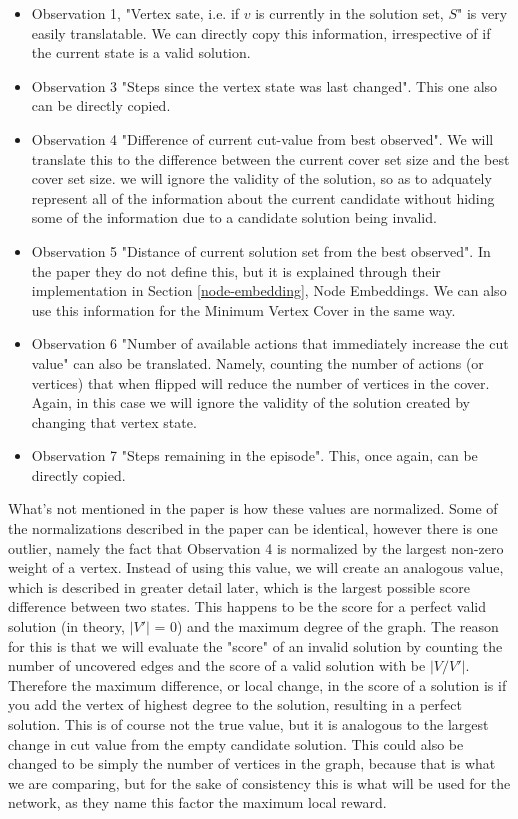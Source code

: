\documentclass{article}
\begin{document}
\begin{itemize}
    \item Observation 1, "Vertex sate, i.e. if $v$ is currently in the solution set, $S$" is very easily translatable. We can directly copy this information, irrespective of if the current state is a valid solution.
    \item Observation 3 "Steps since the vertex state was last changed". This one also can be directly copied.
    \item Observation 4 "Difference of current cut-value from best observed". We will translate this to the difference between the current cover set size and the best cover set size. we will ignore the validity of the solution, so as to adquately represent all of the information about the current candidate without hiding some of the information due to a candidate solution being invalid.
    \item Observation 5 "Distance of current solution set from the best observed". In the paper they do not define this, but it is explained through their implementation in Section \ref{node-embedding}, Node Embeddings. We can also use this information for the Minimum Vertex Cover in the same way.
    \item Observation 6 "Number of available actions that immediately increase the cut value" can also be translated. Namely, counting the number of actions (or vertices) that when flipped will reduce the number of vertices in the cover. Again, in this case we will ignore the validity of the solution created by changing that vertex state.
    \item Observation 7 "Steps remaining in the episode". This, once again, can be directly copied.
\end{itemize}

What's not mentioned in the paper is how these values are normalized. Some of the normalizations described in the paper can be identical, however there is one outlier, namely the fact that Observation 4 is normalized by the largest non-zero weight of a vertex. Instead of using this value, we will create an analogous value, which is described in greater detail later, which is the largest possible score difference between two states. This happens to be the score for a perfect valid solution (in theory, $|V'|$ = 0) and the maximum degree of the graph. The reason for this is that we will evaluate the "score" of an invalid solution by counting the number of uncovered edges and the score of a valid solution with be $|V / V'|$. Therefore the maximum difference, or local change, in the score of a solution is if you add the vertex of highest degree to the solution, resulting in a perfect solution. This is of course not the true value, but it is analogous to the largest change in cut value from the empty candidate solution. This could also be changed to be simply the number of vertices in the graph, because that is what we are comparing, but for the sake of consistency this is what will be used for the network, as they name this factor the maximum local reward. 
\end{document}
